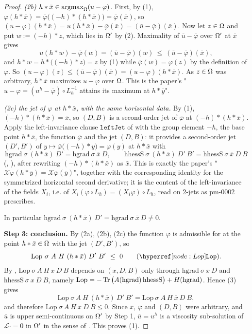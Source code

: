 \begin{proof}
\emph{(2b) $h*\bar x\in\operatorname*{argmax}_\Omega(u-\varphi)$.} First, by (1),
$\varphi(h*\bar x)=\bar\varphi\big((-h)*(h*\bar x)\big)=\bar\varphi(\bar x)$, so
$(u-\varphi)(h*\bar x)=u(h*\bar x)-\bar\varphi(\bar x)=(\bar u-\bar\varphi)(\bar x)$. Now
let $z\in\Omega$ and put $w:=(-h)*z$, which lies in $\Omega'$ by (2). Maximality of
$\bar u-\bar\varphi$ over $\Omega'$ at $\bar x$ gives
\[
 u(h*w)-\bar\varphi(w)=(\bar u-\bar\varphi)(w)\ \le\ (\bar u-\bar\varphi)(\bar x),
\]
and $h*w=h*\big((-h)*z\big)=z$ by (1) while $\bar\varphi(w)=\varphi(z)$ by the definition of
$\varphi$. So $(u-\varphi)(z)\le(\bar u-\bar\varphi)(\bar x)=(u-\varphi)(h*\bar x)$. As
$z\in\Omega$ was arbitrary, $h*\bar x$ maximizes $u-\varphi$ over $\Omega$. This is the paper's
"$u-\varphi=(u^{h}-\bar\varphi)\circ L_h^{-1}$ attains its maximum at $h*\bar y$".

\emph{(2c) the jet of $\varphi$ at $h*\bar x$, with the same horizontal data.} By (1),
$(-h)*(h*\bar x)=\bar x$, so $(D,B)$ is a second-order jet of $\bar\varphi$ at
$(-h)*(h*\bar x)$. Apply the left-invariance clause $\mathtt{leftJet}$ of
 with the group element $-h$, the base point $h*\bar x$, the function
$\bar\varphi$ and the jet $(D,B)$: it provides a second-order jet $(D',B')$ of
$y\mapsto\bar\varphi\big((-h)*y\big)=\varphi(y)$ at $h*\bar x$ with
\[
 \mathrm{hgrad}\ \sigma\ (h*\bar x)\ D'=\mathrm{hgrad}\ \sigma\ \bar x\ D,\qquad
 \mathrm{hhessS}\ \sigma\ (h*\bar x)\ D'\ B'=\mathrm{hhessS}\ \sigma\ \bar x\ D\ B
 \tag{3}
\]
(, ), after rewriting $(-h)*(h*\bar x)$ as $\bar x$. This is
exactly the paper's "$\mathcal X\varphi(h*\bar y)=\mathcal X\bar\varphi(\bar y)$", together
with the corresponding identity for the symmetrized horizontal second derivative; it is the
content of the left-invariance of the fields $X_i$, i.e. of
$X_i(\varphi\circ L_h)=(X_i\varphi)\circ L_h$, read on $2$-jets as pm-0002 prescribes.

In particular $\mathrm{hgrad}\ \sigma\ (h*\bar x)\ D'=\mathrm{hgrad}\ \sigma\ \bar x\ D\ne0$.

\medskip\noindent\textbf{Step 3: conclusion.} By (2a), (2b), (2c) the function $\varphi$ is
admissible for  at the point $h*\bar x\in\Omega$ with the jet $(D',B')$,
so
\[
 \mathrm{Lop}\ \sigma\ A\ H\ (h*\bar x)\ D'\ B'\ \le\ 0\qquad(\noderef{Lop}).
\]
By , $\mathrm{Lop}\ \sigma\ A\ H\ x\ D\ B$ depends on $(x,D,B)$ only through
$\mathrm{hgrad}\ \sigma\ x\ D$ and $\mathrm{hhessS}\ \sigma\ x\ D\ B$, namely
$\mathrm{Lop}=-\operatorname{Tr}\big(A(\mathrm{hgrad})\,\mathrm{hhessS}\big)+H(\mathrm{hgrad})$. Hence
(3) gives
\[
 \mathrm{Lop}\ \sigma\ A\ H\ (h*\bar x)\ D'\ B'=\mathrm{Lop}\ \sigma\ A\ H\ \bar x\ D\ B ,
\]
and therefore $\mathrm{Lop}\ \sigma\ A\ H\ \bar x\ D\ B\le0$. Since $\bar x$, $\bar\varphi$
and $(D,B)$ were arbitrary, and $\bar u$ is upper semi-continuous on $\Omega'$ by Step 1,
$\bar u=u^{h}$ is a viscosity sub-solution of $\mathcal L\cdot=0$ in $\Omega'$ in the sense of
. This proves (1).


\end{proof}
